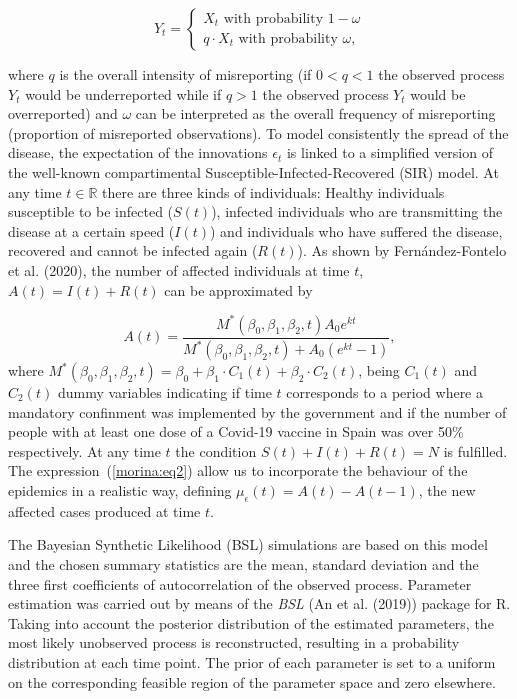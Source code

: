 \documentclass[twoside]{report}
\begin{document}
\begin{equation}\label{morina:eq1}
    Y_t=\left\{
                \begin{array}{ll}
                  X_t \text{ with probability } 1-\omega \\
                  q \cdot X_t \text{ with probability } \omega,
                \end{array}
              \right.
\end{equation}

where $q$ is the overall intensity of misreporting (if $0 < q < 1$ the observed process $Y_t$ would be underreported while if $q > 1$ the observed process $Y_t$ would be overreported) and $\omega$ can be interpreted as the overall frequency of misreporting (proportion of misreported observations). To model consistently the spread of the disease, the expectation of the innovations $\epsilon_t$ is linked to a simplified version of the well-known compartimental Susceptible-Infected-Recovered (SIR) model. At any time $t \in \mathbb{R}$ there are three kinds of individuals: Healthy individuals susceptible to be infected ($S(t)$), infected individuals who are transmitting the disease at a certain speed ($I(t)$) and individuals who have suffered the disease, recovered and cannot be infected again ($R(t)$). As shown by Fern\'andez-Fontelo et al. (2020), the number of affected individuals at time $t$, $A(t) = I(t) + R(t)$ can be approximated by

\begin{equation}\label{morina:eq2}
 A(t) = \frac{M^{*}(\beta_0, \beta_1, \beta_2, t) A_0 e^{kt}}{M^{*}(\beta_0, \beta_1, \beta_2, t)+A_0(e^{kt}-1)},
\end{equation}
where $M^{*}(\beta_0, \beta_1, \beta_2, t) = \beta_0+\beta_1 \cdot C_1(t) + \beta_2 \cdot C_2(t)$, being $C_1(t)$ and $C_2(t)$ dummy variables indicating if time $t$ corresponds to a period where a mandatory confinment was implemented by the government and if the number of people with at least one dose of a Covid-19 vaccine in Spain was over 50\% respectively. At any time $t$ the condition $S(t) + I(t) + R(t) = N$ is fulfilled. The expression~(\ref{morina:eq2}) allow us to incorporate the behaviour of the epidemics in a realistic way, defining $\mu_{\epsilon}(t) = A(t) - A(t-1)$, the new affected cases produced at time $t$.

The Bayesian Synthetic Likelihood (BSL) simulations are based on this model and the chosen summary statistics are the mean, standard deviation and the three first coefficients of autocorrelation of the observed process. Parameter estimation was carried out by means of the \textit{BSL} (An et al. (2019)) package for R. Taking into account the posterior distribution of the estimated parameters, the most likely unobserved process is reconstructed, resulting in a probability distribution at each time point. The prior of each parameter is set to a uniform on the corresponding feasible region of the parameter space and zero elsewhere.
\end{document}
